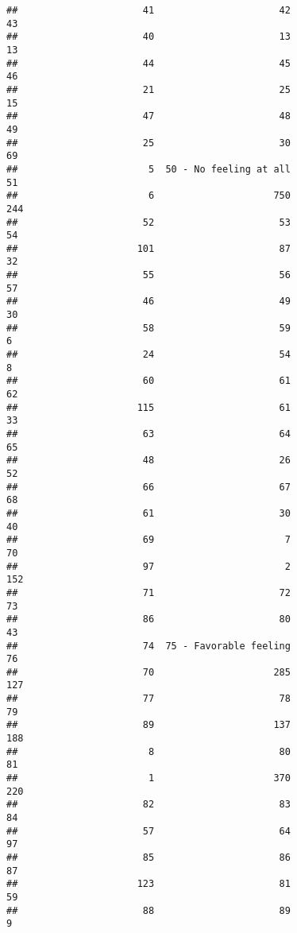 \documentclass[
]{article}
\begin{document}
\begin{verbatim}
##                      41                      42                      43 
##                      40                      13                      13 
##                      44                      45                      46 
##                      21                      25                      15 
##                      47                      48                      49 
##                      25                      30                      69 
##                       5  50 - No feeling at all                      51 
##                       6                     750                     244 
##                      52                      53                      54 
##                     101                      87                      32 
##                      55                      56                      57 
##                      46                      49                      30 
##                      58                      59                       6 
##                      24                      54                       8 
##                      60                      61                      62 
##                     115                      61                      33 
##                      63                      64                      65 
##                      48                      26                      52 
##                      66                      67                      68 
##                      61                      30                      40 
##                      69                       7                      70 
##                      97                       2                     152 
##                      71                      72                      73 
##                      86                      80                      43 
##                      74  75 - Favorable feeling                      76 
##                      70                     285                     127 
##                      77                      78                      79 
##                      89                     137                     188 
##                       8                      80                      81 
##                       1                     370                     220 
##                      82                      83                      84 
##                      57                      64                      97 
##                      85                      86                      87 
##                     123                      81                      59 
##                      88                      89                       9 

\end{verbatim}
\end{document}
